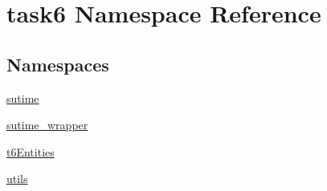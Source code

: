 \hypertarget{namespacetask6}{}\section{task6 Namespace Reference}
\label{namespacetask6}
\subsection*{Namespaces}
\begin{DoxyCompactItemize}
\item 
 \hyperlink{namespacetask6_1_1sutime}{sutime}
\item 
 \hyperlink{namespacetask6_1_1sutime__wrapper}{sutime\+\_\+wrapper}
\item 
 \hyperlink{namespacetask6_1_1t6Entities}{t6\+Entities}
\item 
 \hyperlink{namespacetask6_1_1utils}{utils}
\end{DoxyCompactItemize}
